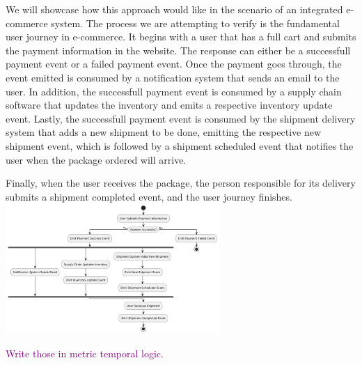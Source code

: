 \documentclass[twocolumn]{article}
\newcommand{\note}[1] {
	\textcolor{Purple}{#1}

}
\begin{document}
We will showcase how this approach would like in the scenario of an integrated e-commerce system.
The process we are attempting to verify is the fundamental user journey in e-commerce.
It begins with a user that has a full cart and submits the payment information in the website.
The response can either be a successfull payment event or a failed payment event.
Once the payment goes through, the event emitted is consumed by a notification system that sends an email to the user.
In addition, the successfull payment event is consumed by a supply chain software that updates the inventory and emits
a respective inventory update event.
Lastly, the successfull payment event is consumed by the shipment delivery system that adds a new shipment to be done,
emitting the respective new shipment event, which is followed by a shipment scheduled event that notifies the user when
the package ordered will arrive.


Finally, when the user receives the package, the person responsible for its delivery submits a shipment completed event,
and the user journey finishes.
\includegraphics[width=3.2in]{events-diagram.pdf}
\par \note{Write those in metric temporal logic.}
\end{document}

